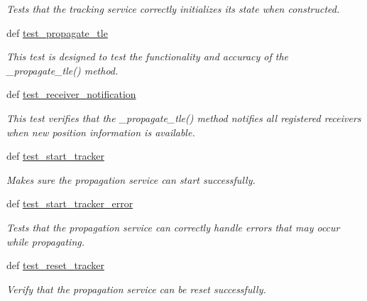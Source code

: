 \begin{DoxyCompactItemize}
\begin{DoxyCompactList}\small\item\em Tests that the tracking service correctly initializes its state when constructed. \end{DoxyCompactList}\item 
def \hyperlink{classhwm_1_1hardware_1_1devices_1_1drivers_1_1sgp4__tracker_1_1tests_1_1test__sgp4__tracker_1_1_test_s_g_p4_tracking_service_af94a5a618cc9466cefa243a17024348e}{test\-\_\-propagate\-\_\-tle}
\begin{DoxyCompactList}\small\item\em This test is designed to test the functionality and accuracy of the \-\_\-propagate\-\_\-tle() method. \end{DoxyCompactList}\item 
def \hyperlink{classhwm_1_1hardware_1_1devices_1_1drivers_1_1sgp4__tracker_1_1tests_1_1test__sgp4__tracker_1_1_test_s_g_p4_tracking_service_a6a35556579846ad37c2d94f69fa48e4c}{test\-\_\-receiver\-\_\-notification}
\begin{DoxyCompactList}\small\item\em This test verifies that the \-\_\-propagate\-\_\-tle() method notifies all registered receivers when new position information is available. \end{DoxyCompactList}\item 
def \hyperlink{classhwm_1_1hardware_1_1devices_1_1drivers_1_1sgp4__tracker_1_1tests_1_1test__sgp4__tracker_1_1_test_s_g_p4_tracking_service_aede83c90044cdcdb9c11522f30f6ea41}{test\-\_\-start\-\_\-tracker}
\begin{DoxyCompactList}\small\item\em Makes sure the propagation service can start successfully. \end{DoxyCompactList}\item 
def \hyperlink{classhwm_1_1hardware_1_1devices_1_1drivers_1_1sgp4__tracker_1_1tests_1_1test__sgp4__tracker_1_1_test_s_g_p4_tracking_service_add4e1cd9af4953acd6b63dcdcb15da71}{test\-\_\-start\-\_\-tracker\-\_\-error}
\begin{DoxyCompactList}\small\item\em Tests that the propagation service can correctly handle errors that may occur while propagating. \end{DoxyCompactList}\item 
def \hyperlink{classhwm_1_1hardware_1_1devices_1_1drivers_1_1sgp4__tracker_1_1tests_1_1test__sgp4__tracker_1_1_test_s_g_p4_tracking_service_aa38b8aea11adbde4ffa2c7ccf12544a9}{test\-\_\-reset\-\_\-tracker}
\begin{DoxyCompactList}\small\item\em Verify that the propagation service can be reset successfully. \end{DoxyCompactList}\end{DoxyCompactItemize}
